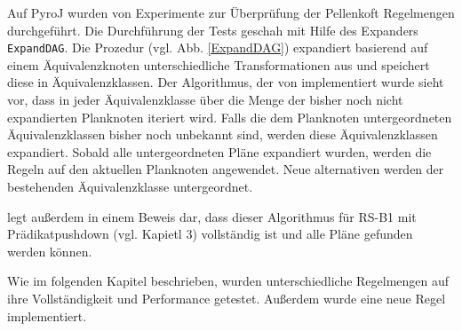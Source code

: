 Auf PyroJ wurden von \cite{shanbhag2014optimizing} Experimente zur Überprüfung der Pellenkoft Regelmengen durchgeführt. Die Durchführung der Tests geschah mit Hilfe des Expanders \texttt{ExpandDAG}. Die Prozedur (vgl. Abb. \ref{ExpandDAG}) expandiert basierend auf einem Äquivalenzknoten unterschiedliche Transformationen aus und speichert diese in Äquivalenzklassen. Der Algorithmus, der von \cite{roy2001multi} implementiert wurde sieht vor, dass in jeder Äquivalenzklasse über die Menge der bisher noch nicht expandierten Planknoten iteriert wird. Falls die dem Planknoten untergeordneten Äquivalenzklassen bisher noch unbekannt sind, werden diese Äquivalenzklassen expandiert. Sobald alle untergeordneten Pläne expandiert wurden, werden die Regeln auf den aktuellen Planknoten angewendet. Neue alternativen werden der bestehenden Äquivalenzklasse untergeordnet.

\cite{roy2001multi} legt außerdem in einem Beweis dar, dass dieser Algorithmus für RS-B1 mit Prädikatpushdown (vgl. Kapietl 3) vollständig ist und alle Pläne gefunden werden können. 

Wie im folgenden Kapitel beschrieben, wurden unterschiedliche Regelmengen auf ihre Vollständigkeit und Performance getestet. Außerdem wurde eine neue Regel implementiert. 
